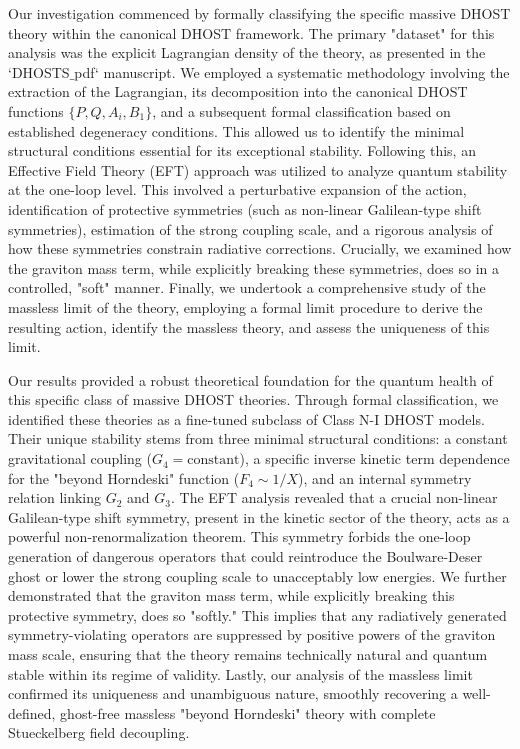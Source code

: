 \documentclass[twocolumn]{aastex631}
\begin{document}
Our investigation commenced by formally classifying the specific massive DHOST theory within the canonical DHOST framework. The primary "dataset" for this analysis was the explicit Lagrangian density of the theory, as presented in the `DHOSTS\ensuremath{\_}pdf` manuscript. We employed a systematic methodology involving the extraction of the Lagrangian, its decomposition into the canonical DHOST functions $\{P, Q, A_i, B_1\}$, and a subsequent formal classification based on established degeneracy conditions. This allowed us to identify the minimal structural conditions essential for its exceptional stability. Following this, an Effective Field Theory (EFT) approach was utilized to analyze quantum stability at the one-loop level. This involved a perturbative expansion of the action, identification of protective symmetries (such as non-linear Galilean-type shift symmetries), estimation of the strong coupling scale, and a rigorous analysis of how these symmetries constrain radiative corrections. Crucially, we examined how the graviton mass term, while explicitly breaking these symmetries, does so in a controlled, "soft" manner. Finally, we undertook a comprehensive study of the massless limit of the theory, employing a formal limit procedure to derive the resulting action, identify the massless theory, and assess the uniqueness of this limit.

Our results provided a robust theoretical foundation for the quantum health of this specific class of massive DHOST theories. Through formal classification, we identified these theories as a fine-tuned subclass of Class N-I DHOST models. Their unique stability stems from three minimal structural conditions: a constant gravitational coupling ($G_4 = \text{constant}$), a specific inverse kinetic term dependence for the "beyond Horndeski" function ($F_4 \sim 1/X$), and an internal symmetry relation linking $G_2$ and $G_3$. The EFT analysis revealed that a crucial non-linear Galilean-type shift symmetry, present in the kinetic sector of the theory, acts as a powerful non-renormalization theorem. This symmetry forbids the one-loop generation of dangerous operators that could reintroduce the Boulware-Deser ghost or lower the strong coupling scale to unacceptably low energies. We further demonstrated that the graviton mass term, while explicitly breaking this protective symmetry, does so "softly." This implies that any radiatively generated symmetry-violating operators are suppressed by positive powers of the graviton mass scale, ensuring that the theory remains technically natural and quantum stable within its regime of validity. Lastly, our analysis of the massless limit confirmed its uniqueness and unambiguous nature, smoothly recovering a well-defined, ghost-free massless "beyond Horndeski" theory with complete Stueckelberg field decoupling.
\end{document}
